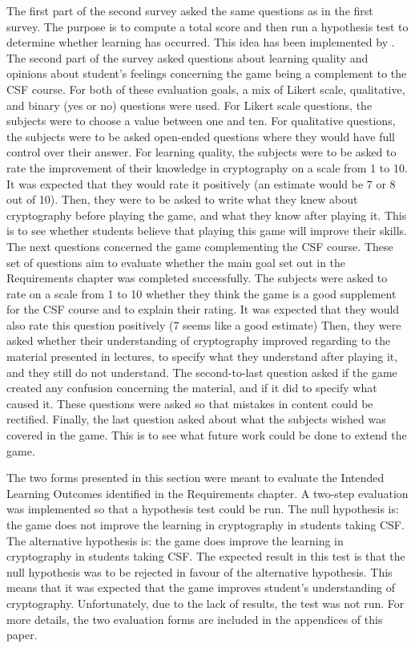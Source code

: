 \documentclass{l4proj}
\begin{document}
The first part of the second survey asked the same questions as in the first survey.
The purpose is to compute a total score and then run a hypothesis test to determine whether learning has occurred.
This idea has been implemented by \citet{su_mobile_2015}.
The second part of the survey asked questions about learning quality 
and opinions about student's feelings concerning the game being a complement to the CSF course.
For both of these evaluation goals, a mix of Likert scale, qualitative, and binary (yes or no) questions were used.
For Likert scale questions, the subjects were to choose a value between one and ten.
For qualitative questions, the subjects were to be asked open-ended questions 
where they would have full control over their answer.
For learning quality, the subjects were to be asked to rate the improvement of their knowledge in cryptography
on a scale from 1 to 10. It was expected that they would rate it positively (an estimate would be 7 or 8 out of 10).
Then, they were to be asked to write what they knew about cryptography before playing the game, 
and what they know after playing it. This is to see whether students believe that playing this game will improve their skills.
The next questions concerned the game complementing the CSF course.
These set of questions aim to evaluate whether the main goal set out in the Requirements chapter was completed successfully. 
The subjects were asked to rate on a scale from 1 to 10 whether they think the game is a good supplement for the CSF course 
and to explain their rating. It was expected that they would also rate this question positively (7 seems like a good estimate)
Then, they were asked whether their understanding of cryptography improved regarding to the material presented in lectures, 
to specify what they understand after playing it, and they still do not understand.
The second-to-last question asked if the game created any confusion concerning the material, 
and if it did to specify what caused it. 
These questions were asked so that mistakes in content could be rectified.
Finally, the last question asked about what the subjects wished was covered in the game.
This is to see what future work could be done to extend the game.

The two forms presented in this section were meant to evaluate the Intended Learning Outcomes identified in the Requirements chapter.
A two-step evaluation was implemented so that a hypothesis test could be run.
The null hypothesis is: the game does not improve the learning in cryptography in students taking CSF.
The alternative hypothesis is: the game does improve the learning in cryptography in students taking CSF.
The expected result in this test is that the null hypothesis was to be rejected in favour of the alternative hypothesis.
This means that it was expected that the game improves student's understanding of cryptography.
Unfortunately, due to the lack of results, the test was not run.
For more details, the two evaluation forms are included in the appendices of this paper.
\end{document}
